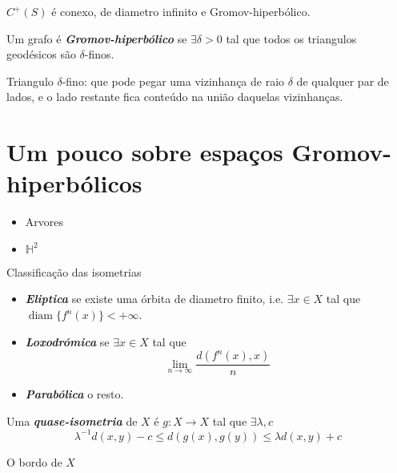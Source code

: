 \begin{thm}\leavevmode
	$C^+(S)$ é conexo, de diametro infinito e Gromov-hiperbólico.
\end{thm}

\begin{defn}\leavevmode
	Um grafo é \textit{\textbf{Gromov-hiperbólico}} se $\exists \delta>0$ tal que todos os triangulos geodésicos são $\delta$-finos. 
\end{defn}

\begin{defn}\leavevmode
	Triangulo $\delta$-fino: que pode pegar uma vizinhança de raio $\delta $ de qualquer par de lados, e o lado restante fica conteúdo na união daquelas vizinhanças.
\end{defn}

\section{Um pouco sobre espaços Gromov-hiperbólicos}

\begin{example}\leavevmode
	\begin{itemize}
	\item Arvores
	\item $\mathbb{H}^2$
	\end{itemize}
\end{example}

\begin{thing3}{Classificação das isometrias}\leavevmode
	\begin{itemize}
		\item \textit{\textbf{Eliptica}} se existe uma órbita de diametro finito, i.e. $\exists x  \in X$ tal que $\operatorname{di a m}\{f^n(x)\}<+\infty$.
	\item \textit{\textbf{Loxodrómica}} se $\exists x \in X$ tal que 
		\[\lim_{n \to \infty} \frac{d(f^n(x),x)}{n}\]
	\item \textit{\textbf{Parabólica}} o resto.
	\end{itemize}
\end{thing3}


\begin{defn}\leavevmode
	Uma \textit{\textbf{quase-isometria}} de $X$ é $g:X\to X$ tal que $\exists \lambda,c$ 
	\[\lambda^{-1}d(x,y)-c\leq d(g(x),g(y))\leq \lambda d(x,y)+c\]
\end{defn}

\begin{thing7}{O bordo de $X$}\leavevmode
	
\end{thing7}

